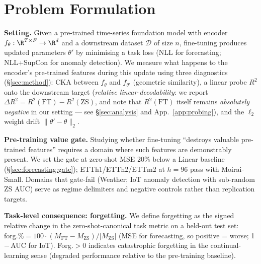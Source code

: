 \section{Problem Formulation}
\label{sec:problem}

\textbf{Setting.}
Given a pre-trained time-series foundation model with encoder
$f_\theta: \R^{T \times F} \to \R^d$ and a downstream dataset
$\mathcal{D}$ of size $n$, fine-tuning produces updated parameters
$\theta'$ by minimising a task loss (NLL for forecasting; NLL+SupCon
for anomaly detection).  We measure what happens to the encoder's
pre-trained features during this update using three diagnostics
(\S\ref{sec:method}): CKA between $f_\theta$ and $f_{\theta'}$
(geometric similarity), a linear probe $R^2$ onto the downstream
target (\emph{relative linear-decodability}: we report
$\Delta R^2 {=} R^2(\text{FT}){-}R^2(\text{ZS})$, and note that
$R^2(\text{FT})$ itself remains \emph{absolutely negative} in our
setting --- see \S\ref{sec:analysis} and App.~\ref{app:probing}), and the $\ell_2$ weight drift
$\|\theta' - \theta\|_2$.

\textbf{Pre-training value gate.}
Studying whether fine-tuning ``destroys valuable pre-trained
features'' requires a domain where such features are demonstrably
present.  We set the gate at zero-shot MSE 20\% below a Linear
baseline (\S\ref{sec:forecasting:gate}); ETTh1/ETTh2/ETTm2 at
$h{=}96$ pass with Moirai-Small.  Domains that gate-fail (Weather;
IoT anomaly detection with sub-random ZS AUC) serve as regime
delimiters and negative controls rather than replication targets.

\textbf{Task-level consequence: forgetting.}
We define forgetting as the signed relative change in the
zero-shot-canonical task metric on a held-out test set:
$\text{forg.\%} = 100 \cdot (M_{\text{FT}} - M_{\text{ZS}}) /
|M_{\text{ZS}}|$ (MSE for forecasting, so positive = worse;
1\,$-$\,AUC for IoT).  Forg.$>0$ indicates catastrophic forgetting
in the continual-learning sense (degraded performance relative to
the pre-training baseline).
